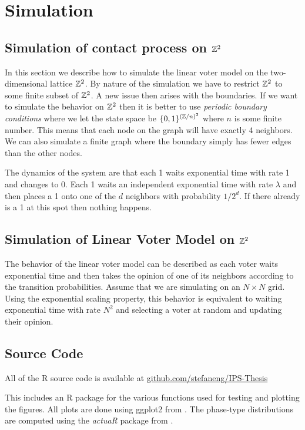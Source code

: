 \section{Simulation}

\subsection{Simulation of contact process on \texorpdfstring{$\mathbb{Z}^2$}{Z2}}
In this section we describe how to simulate the linear voter model on the two-dimensional lattice $\mathbb{Z}^2$.
By nature of the simulation we have to restrict $\mathbb{Z}^2$ to some finite subset of $\mathbb{Z}^2$.
A new issue then arises with the boundaries.
If we want to simulate the behavior on $\mathbb{Z}^2$ then it is better to use \textit{periodic boundary conditions} where we let the state space be $\{0,1\}^{(\mathbb{Z}/n)^2}$ where $n$ is some finite number.
This means that each node on the graph will have exactly 4 neighbors.
We can also simulate a finite graph where the boundary simply has fewer edges than the other nodes.

The dynamics of the system are that each 1 waits exponential time with rate 1 and changes to 0.
Each 1 waits an independent exponential time with rate $\lambda$ and then places a 1 onto one of the $d$ neighbors with probability $1/2^d$.
If there already is a 1 at this spot then nothing happens.

\subsection{Simulation of Linear Voter Model on \texorpdfstring{$\mathbb{Z}^2$}{Z2}}

The behavior of the linear voter model can be described as each voter waits exponential time and then takes the opinion of one of its neighbors according to the transition probabilities.
Assume that we are simulating on an $N \times N$ grid.
Using the exponential scaling property, this behavior is equivalent to waiting exponential time with rate $N^2$ and selecting a voter at random and updating their opinion.

\subsection{Source Code}

All of the R source code is available at \href{https://github.com/stefaneng/IPS-Thesis}{github.com/stefaneng/IPS-Thesis}

\noindent This includes an R package for the various functions used for testing and plotting the figures.
All plots are done using ggplot2 from \cite{ggplot2}.
The phase-type distributions are computed using the \textit{actuaR} package from \cite{actuar2008}.